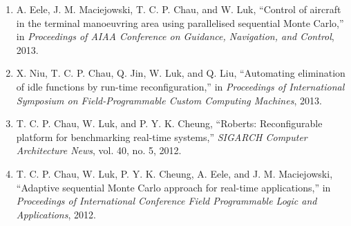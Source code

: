 \begin{publications}
\begin{enumerate}[I]
\item A. Eele, J. M. Maciejowski, T. C. P. Chau, and W. Luk, ``Control of aircraft in the terminal manoeuvring area using parallelised sequential Monte Carlo,'' in \textit{Proceedings of AIAA Conference on Guidance, Navigation, and Control}, 2013.
\item X. Niu, T. C. P. Chau, Q. Jin, W. Luk, and Q. Liu, ``Automating elimination of idle functions by run-time reconfiguration,'' in \textit{Proceedings of International Symposium on Field-Programmable Custom Computing Machines}, 2013.%
\item T. C. P. Chau, W. Luk, and P. Y. K. Cheung, ``Roberts: Reconfigurable platform for benchmarking real-time systems,'' \textit{SIGARCH Computer Architecture News}, vol. 40, no. 5, 2012.
\item T. C. P. Chau, W. Luk, P. Y. K. Cheung, A. Eele, and J. M. Maciejowski, ``Adaptive sequential Monte Carlo approach for real-time applications,'' in \textit{Proceedings of International Conference Field Programmable Logic and Applications}, 2012.%
\end{enumerate}

\end{publications}
